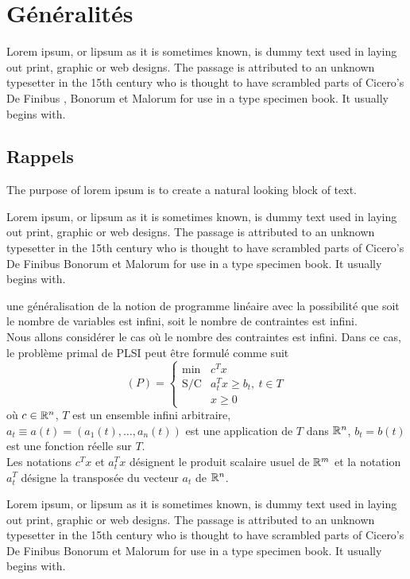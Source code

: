 \mainmatter
\chapter{Généralités}
Lorem ipsum, or lipsum as it is sometimes known, is dummy text used in laying out print, graphic or web designs. The passage is attributed to an unknown typesetter in the 15th century who is thought to have scrambled parts of Cicero's De Finibus \cite{b1}, Bonorum et Malorum for use in a type specimen book. It usually begins with.
 
 
  
\section{Rappels}
The purpose of lorem ipsum is to create a natural looking block of text.

Lorem ipsum, or lipsum as it is sometimes known, is dummy text used in laying out print, graphic or web designs. The passage is attributed to an unknown typesetter in the 15th century who is thought to have scrambled parts of Cicero's De Finibus Bonorum et Malorum for use in a type specimen book. It usually begins with.
\begin{definition}\label{321}
 une généralisation de la notion de programme linéaire avec la possibilité que soit le nombre de variables est infini, soit le nombre de contraintes est infini.\\
	
	Nous allons considérer le cas où le nombre des contraintes est infini. Dans ce cas, le problème primal de PLSI peut être formulé comme suit 
	\begin{equation}\label{II3}
		(P) = \left \lbrace \begin{array}{ll}
			\text{min}& c^Tx\\
			\text{S/C} & a^T_t x \geq b_t, \ t  \in T\\
			& x\geq 0
		\end{array}\right. 
	\end{equation}où $c \in \mathbb{R}^n$, $T$ est un ensemble infini arbitraire, $a_t \equiv a(t)=(a_1(t),\dots,a_n(t))$ est une application de $T$ dans $\mathbb{R}^n$, $b_t = b(t)$ est une fonction réelle sur $T$. \\ Les notations $c^T x$ et $ a_t^T x$ désignent le produit scalaire usuel de $\mathbb{R}^m$ et la notation $a_t^T$ désigne la transposée du vecteur $a_t$ de $\mathbb{R}^n$.	
\end{definition}
Lorem ipsum, or lipsum as it is sometimes known, is dummy text used in laying out print, graphic or web designs. The passage is attributed to an unknown typesetter in the 15th century who is thought to have scrambled parts of Cicero's De Finibus Bonorum et Malorum for use in a type specimen book. It usually begins with.


